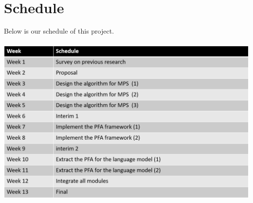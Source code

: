\documentclass[a4paper]{article}
\begin{document}
\section{Schedule}
Below is our schedule of this project.\\
\\
\includegraphics[scale=0.48]{schedule}



\end{document}

